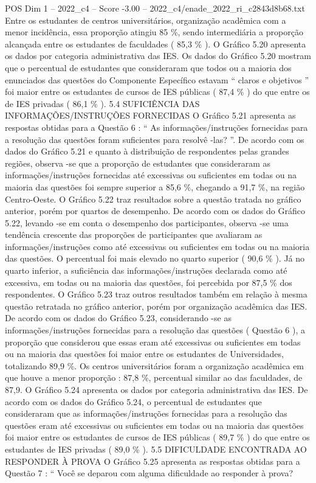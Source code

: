 \begin{textsample}{POS Dim 1 – 2022\_c4 – Score -3.00 – 2022\_c4/enade\_2022\_ri\_c2843d8b68.txt}
Entre os estudantes de centros universitários, organização acadêmica com a menor incidência, essa proporção atingiu 85 \%, sendo intermediária a proporção alcançada entre os estudantes de faculdades ( 85,3 \% ).
O Gráfico 5.20 apresenta os dados por categoria administrativa das IES.
Os dados do Gráfico 5.20 mostram que o percentual de estudantes que consideraram que todos ou a maioria dos enunciados das questões do Componente Específico estavam “ claros e objetivos ” foi maior entre os estudantes de cursos de IES públicas ( 87,4 \% ) do que entre os de IES privadas ( 86,1 \% ). 5.4 SUFICIÊNCIA DAS INFORMAÇÕES/INSTRUÇÕES FORNECIDAS O Gráfico 5.21 apresenta as respostas obtidas para a Questão 6 : “ As informações/instruções fornecidas para a resolução das questões foram suficientes para resolvê -las? ”.
De acordo com os dados do Gráfico 5.21 e quanto à distribuição de respondentes pelas grandes regiões, observa -se que a proporção de estudantes que consideraram as informações/instruções fornecidas até excessivas ou suficientes em todas ou na maioria das questões foi sempre superior a 85,6 \%, chegando a 91,7 \%, na região Centro-Oeste.
O Gráfico 5.22 traz resultados sobre a questão tratada no gráfico anterior, porém por quartos de desempenho.
De acordo com os dados do Gráfico 5.22, levando -se em conta o desempenho dos participantes, observa -se uma tendência crescente das proporções de participantes que avaliaram as informações/instruções como até excessivas ou suficientes em todas ou na maioria das questões.
O percentual foi mais elevado no quarto superior ( 90,6 \% ).
Já no quarto inferior, a suficiência das informações/instruções declarada como até excessiva, em todas ou na maioria das questões, foi percebida por 87,5 \% dos respondentes.
O Gráfico 5.23 traz outros resultados também em relação à mesma questão retratada no gráfico anterior, porém por organização acadêmica das IES.
De acordo com os dados do Gráfico 5.23, considerando -se as informações/instruções fornecidas para a resolução das questões ( Questão 6 ), a proporção que considerou que essas eram até excessivas ou suficientes em todas ou na maioria das questões foi maior entre os estudantes de Universidades, totalizando 89,9 \%.
Os centros universitários foram a organização acadêmica em que houve a menor proporção : 87,8 \%, percentual similar ao das faculdades, de 87,9.
O Gráfico 5.24 apresenta os dados por categoria administrativa das IES.
De acordo com os dados do Gráfico 5.24, o percentual de estudantes que consideraram que as informações/instruções fornecidas para a resolução das questões eram até excessivas ou suficientes em todas ou na maioria das questões foi maior entre os estudantes de cursos de IES públicas ( 89,7 \% ) do que entre os estudantes de IES privadas ( 89,0 \% ). 5.5 DIFICULDADE ENCONTRADA AO RESPONDER À PROVA O Gráfico 5.25 apresenta as respostas obtidas para a Questão 7 : “ Você se deparou com alguma dificuldade ao responder à prova?

\end{textsample}
